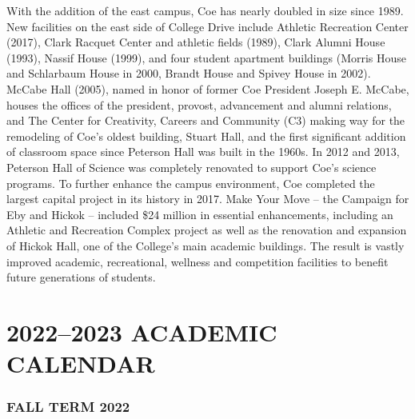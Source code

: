 \documentclass[
  letterpaper,
]{scrbook}
\renewcommand{\part}[1]{\addcontentsline{toc}{part}{#1}}
\begin{document}
With the addition of the east campus, Coe has nearly doubled in size
since 1989. New facilities on the east side of College Drive include
Athletic Recreation Center (2017), Clark Racquet Center and athletic
fields (1989), Clark Alumni House (1993), Nassif House (1999), and four
student apartment buildings (Morris House and Schlarbaum House in 2000,
Brandt House and Spivey House in 2002). McCabe Hall (2005), named in
honor of former Coe President Joseph E. McCabe, houses the offices of
the president, provost, advancement and alumni relations, and The Center
for Creativity, Careers and Community (C3) making way for the remodeling
of Coe's oldest building, Stuart Hall, and the first significant
addition of classroom space since Peterson Hall was built in the 1960s.
In 2012 and 2013, Peterson Hall of Science was completely renovated to
support Coe's science programs. To further enhance the campus
environment, Coe completed the largest capital project in its history in
2017. Make Your Move -- the Campaign for Eby and Hickok -- included \$24
million in essential enhancements, including an Athletic and Recreation
Complex project as well as the renovation and expansion of Hickok Hall,
one of the College's main academic buildings. The result is vastly
improved academic, recreational, wellness and competition facilities to
benefit future generations of students.

\part{ACADEMIC RESOURCES}

\chapter{2022--2023 ACADEMIC CALENDAR}\label{sec-academic-calendar}

\subsection{FALL TERM 2022}\label{fall-term-2022}
\end{document}
